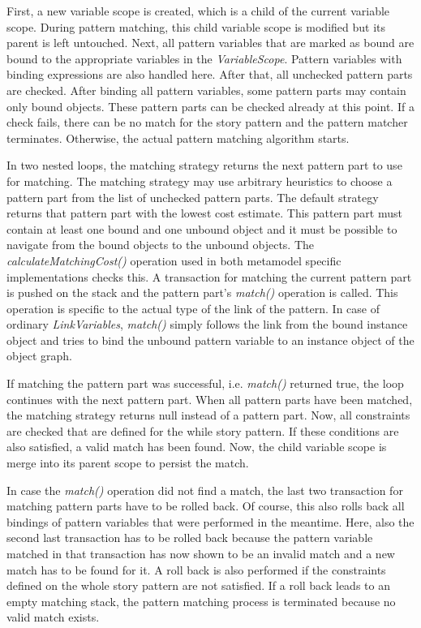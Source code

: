 First, a new variable scope is created, which is a child of the current variable scope.
During pattern matching, this child variable scope is modified but its parent is left untouched.
Next, all pattern variables that are marked as bound are bound to the appropriate variables in the \emph{VariableScope}.
Pattern variables with binding expressions are also handled here.
After that, all unchecked pattern parts are checked.
After binding all pattern variables, some pattern parts may contain only bound objects.
These pattern parts can be checked already at this point.
If a check fails, there can be no match for the story pattern and the pattern matcher terminates.
Otherwise, the actual pattern matching algorithm starts.

In two nested loops, the matching strategy returns the next pattern part to use for matching.
The matching strategy may use arbitrary heuristics to choose a pattern part from the list of unchecked pattern parts.
The default strategy returns that pattern part with the lowest cost estimate.
This pattern part must contain at least one bound and one unbound object and it must be possible to navigate from the bound objects to the unbound objects.
The \emph{calculateMatchingCost()} operation used in both metamodel specific implementations checks this.
A transaction for matching the current pattern part is pushed on the stack and the pattern part's \emph{match()} operation is called.
This operation is specific to the actual type of the link of the pattern.
In case of ordinary \emph{LinkVariables}, \emph{match()} simply follows the link from the bound instance object and tries to bind the unbound pattern variable to an instance object of the object graph.

If matching the pattern part was successful, i.e. \emph{match()} returned true, the loop continues with the next pattern part.
When all pattern parts have been matched, the matching strategy returns null instead of a pattern part.
Now, all constraints are checked that are defined for the while story pattern.
If these conditions are also satisfied, a valid match has been found.
Now, the child variable scope is merge into its parent scope to persist the match.

In case the \emph{match()} operation did not find a match, the last two transaction for matching pattern parts have to be rolled back.
Of course, this also rolls back all bindings of pattern variables that were performed in the meantime.
Here, also the second last transaction has to be rolled back because the pattern variable matched in that transaction has now shown to be an invalid match and a new match has to be found for it.
A roll back is also performed if the constraints defined on the whole story pattern are not satisfied.
If a roll back leads to an empty matching stack, the pattern matching process is terminated because no valid match exists.


